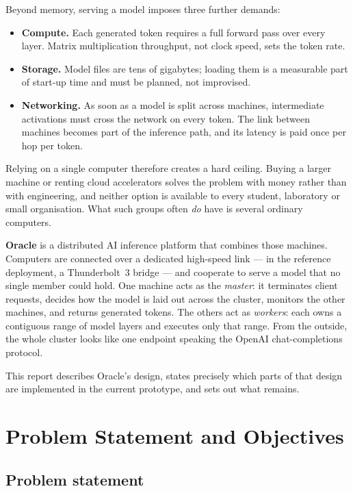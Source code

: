 \documentclass[11pt,a4paper]{article}
\begin{document}
Beyond memory, serving a model imposes three further demands:

\begin{itemize}
  \item \textbf{Compute.} Each generated token requires a full forward pass over
        every layer. Matrix multiplication throughput, not clock speed, sets the
        token rate.
  \item \textbf{Storage.} Model files are tens of gigabytes; loading them is a
        measurable part of start-up time and must be planned, not improvised.
  \item \textbf{Networking.} As soon as a model is split across machines,
        intermediate activations must cross the network on every token. The link
        between machines becomes part of the inference path, and its latency is
        paid once per hop per token.
\end{itemize}

Relying on a single computer therefore creates a hard ceiling. Buying a larger
machine or renting cloud accelerators solves the problem with money rather than
with engineering, and neither option is available to every student, laboratory
or small organisation. What such groups often \emph{do} have is several ordinary
computers.

\textbf{Oracle} is a distributed AI inference platform that combines those
machines. Computers are connected over a dedicated high-speed link --- in the
reference deployment, a Thunderbolt~3 bridge --- and cooperate to serve a model
that no single member could hold. One machine acts as the \emph{master}: it
terminates client requests, decides how the model is laid out across the
cluster, monitors the other machines, and returns generated tokens. The others
act as \emph{workers}: each owns a contiguous range of model layers and executes
only that range. From the outside, the whole cluster looks like one endpoint
speaking the OpenAI chat-completions protocol.

This report describes Oracle's design, states precisely which parts of that
design are implemented in the current prototype, and sets out what remains.

\section{Problem Statement and Objectives}

\subsection{Problem statement}
\end{document}
